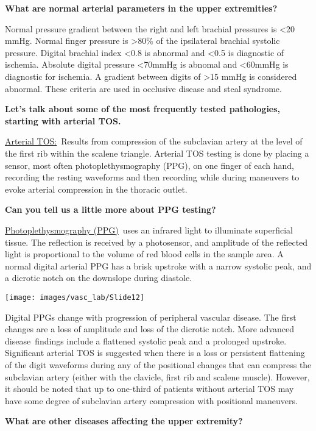 \documentclass[
]{book}
\begin{document}
\textbf{What are normal arterial parameters in the upper extremities?}

Normal pressure gradient between the right and left brachial pressures
is \textless20 mmHg. Normal finger pressure is \textgreater80\% of the ipsilateral
brachial systolic pressure. Digital brachial index \textless0.8 is abnormal and
\textless0.5 is diagnostic of ischemia. Absolute digital pressure \textless70mmHg is
abnomal and \textless60mmHg is diagnostic for ischemia. A gradient between
digits of \textgreater15 mmHg is considered abnormal. These criteria are used in
occlusive disease and steal syndrome.\citep{chloros2008, sen2016}

\textbf{Let's talk about some of the most frequently tested pathologies,
starting with arterial TOS.}

\uline{Arterial TOS:}~Results from compression of the subclavian
artery at the level of the first rib within the scalene triangle.
Arterial TOS testing is done by placing a sensor, most often
photoplethysmography (PPG), on one finger of each hand, recording the
resting waveforms and then recording while during maneuvers to evoke
arterial compression in the thoracic outlet.\citep{size2013}

\textbf{Can you tell us a little more about PPG testing?}

\uline{Photoplethysmography (PPG)}~uses an infrared light to
illuminate superficial tissue. The reflection is received by a
photosensor, and amplitude of the reflected light is proportional to the
volume of red blood cells in the sample area. A normal digital arterial
PPG has a brisk upstroke with a narrow systolic peak, and a dicrotic
notch on the downslope during diastole.\citep{carter2001}

\texttt{[image: images/vasc\_lab/Slide12]}

Digital PPGs change with progression of peripheral vascular disease. The
first changes are a loss of amplitude and loss of the dicrotic notch.
More advanced disease~findings include a flattened systolic peak and a
prolonged upstroke. Significant arterial TOS is suggested when there is
a loss or persistent flattening of the digit waveforms during any of the
positional changes that can compress the subclavian artery (either with
the clavicle, first rib and scalene muscle). However, it should be noted
that up to one-third of patients without arterial TOS may have some
degree of subclavian artery compression with positional maneuvers.

\textbf{What are other diseases affecting the upper extremity?}
\end{document}
